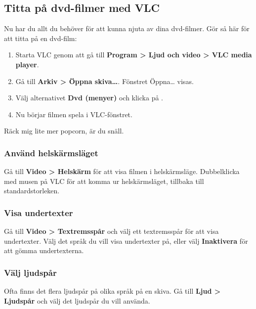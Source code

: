 \documentclass[a4paper,final]{memoir} %
\begin{document}
\subsection{Titta på dvd-filmer med VLC}


Nu har du allt du behöver för att kunna njuta av dina dvd-filmer. Gör så här för att titta på en dvd-film:

\begin{enumerate}

\item Starta VLC genom att gå till \textbf{Program \textgreater{} Ljud och video \textgreater{} VLC media player}.

\item Gå till \textbf{Arkiv \textgreater{} Öppna skiva\ldots{}}. Fönstret Öppna\ldots{} visas.

\item Välj alternativet \textbf{Dvd (menyer)} och klicka på \xok{}.

\item Nu börjar filmen spela i VLC-fönstret. 

\end{enumerate}

Räck mig lite mer popcorn, är du snäll.

\subsubsection{Använd helskärmsläget}

Gå till \textbf{Video \textgreater{} Helskärm} för att visa filmen i helskärmsläge. Dubbelklicka med musen på VLC för att komma ur helskärmsläget, tillbaka till standardstorleken.

\subsubsection{Visa undertexter}

Gå till \textbf{Video \textgreater{} Textremsspår} och välj ett textremsspår för att visa undertexter. Välj det språk du vill visa undertexter på, eller välj \textbf{Inaktivera} för att gömma undertexterna.

\subsubsection{Välj ljudspår}

Ofta finns det flera ljudspår på olika språk på en skiva. Gå till \textbf{Ljud \textgreater{} Ljudspår} och välj det ljudspår du vill använda. 
\end{document}
